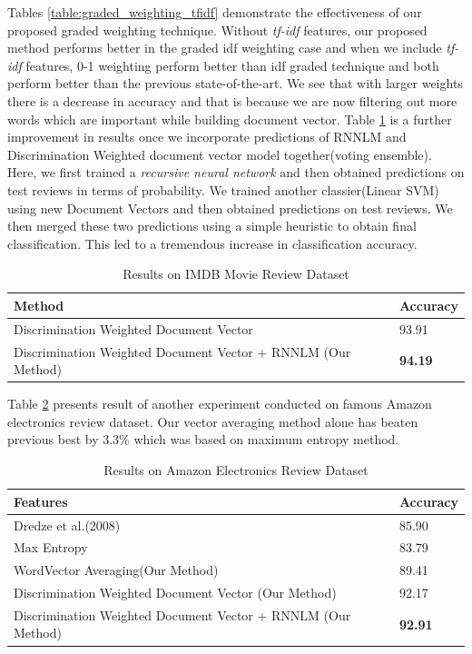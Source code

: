 \documentclass[11pt,a4paper]{article}
\begin{document}
Tables \ref{table:graded_weighting_tfidf} demonstrate the effectiveness of our proposed graded weighting technique. Without \emph{tf-idf} features, our proposed method performs better in the graded idf weighting case and when we include \emph{tf-idf} features, 0-1 weighting perform better than idf graded technique and both perform better than the previous state-of-the-art. We see that with larger weights there is a decrease in accuracy and that is because we are now filtering out more words which are important while building document vector.
Table \ref{table:IMDB_rnnlm} is a further improvement in results once we incorporate predictions of RNNLM and Discrimination Weighted document vector model together(voting ensemble). Here, we first trained a \emph{recursive neural network} and then obtained predictions on test reviews in terms of probability. We trained another classier(Linear SVM) using new Document Vectors and then obtained predictions on test reviews. We then merged these two predictions using a simple heuristic to obtain final classification. This led to a tremendous increase in classification accuracy.

\begin {table}[H]
\centering
\small
\begin{tabular}{ | p{5.5cm} | p{1.2cm} | }
\hline
\textbf{Method} & \textbf{Accuracy} \\ \hline
Discrimination Weighted Document Vector & 93.91\\ \hline
Discrimination Weighted Document Vector + RNNLM (Our Method) & \textbf{94.19}\\ \hline
\end{tabular}
\caption {Results on IMDB Movie Review Dataset}
\label{table:IMDB_rnnlm}
\end{table}

Table \ref{table:amazon} presents result of another experiment conducted on famous Amazon electronics review dataset. Our vector averaging method alone has beaten previous best by 3.3\% which was based on maximum entropy method.
\begin {table}[H]
\centering
\small
\begin{tabular}{ | p{5.5cm} | p{1.2cm} | }
\hline
\textbf{Features} & \textbf{Accuracy} \\ \hline
Dredze et al.(2008) & 85.90\\ \hline
Max Entropy & 83.79\\ \hline
WordVector Averaging(Our Method) & 89.41\\ \hline
Discrimination Weighted Document Vector (Our Method) & 92.17\\ \hline
Discrimination Weighted Document Vector + RNNLM (Our Method) & \textbf{92.91}\\ \hline
\end{tabular}
\caption {Results on Amazon Electronics Review Dataset}
\label{table:amazon}
\end{table}
\end{document}
